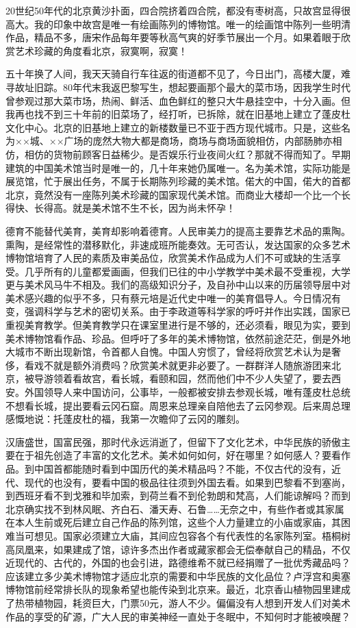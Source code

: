 \documentclass{article}
\begin{document}
20世纪50年代的北京黄沙扑面，四合院挤着四合院，都没有枣树高，只故宫显得很高大。我的印象中故宫是唯一有绘画陈列的博物馆。唯一的绘画馆中陈列一些明清作品，精品不多，唐宋作品每年要等秋高气爽的好季节展出一个月。如果着眼于欣赏艺术珍藏的角度看北京，寂寞啊，寂寞！

五十年换了人间，我天天骑自行车往返的街道都不见了，今日出门，高楼大厦，难寻故址旧踪。80年代末我返巴黎写生，想起要画那个最大的菜市场，因我学生时代曾参观过那大菜市场，热闹、鲜活、血色鲜红的整只大牛悬挂空中，十分入画。但我再也找不到三十年前的旧菜场了，经打听，已拆除，就在旧基地上建立了蓬皮杜文化中心。北京的旧基地上建立的新楼数量已不亚于西方现代城市。只是，这些名为××城、××广场的庞然大物大都是商场，商场与商场面貌相仿，内部肠肺亦相仿，相仿的货物前顾客日益稀少。是否娱乐行业夜间火红？那就不得而知了。早期建筑的中国美术馆当时是唯一的，几十年来她仍属唯一。名为美术馆，实际功能是展览馆，忙于展出任务，不属于长期陈列珍藏的美术馆。偌大的中国，偌大的首都北京，竟然没有一座陈列美术珍藏的国家现代美术馆。而商业大楼却一个比一个长得快、长得高。就是美术馆不生不长，因为尚未怀孕！

德育不能替代美育，美育却影响着德育。人民审美力的提高主要靠艺术品的熏陶。熏陶，是经常性的潜移默化，非速成班所能奏效。无可否认，发达国家的众多艺术博物馆培育了人民的素质及审美品位，欣赏美术作品成为人们不可或缺的生活享受。几乎所有的儿童都爱画画，但我们已往的中小学教学中美术最不受重视，大学更与美术风马牛不相及。我们的高级知识分子，及自孙中山以来的历届领导层中对美术感兴趣的似乎不多，只有蔡元培是近代史中唯一的美育倡导人。今日情况有变，强调科学与艺术的密切关系。由于李政道等科学家的呼吁并作出实践，国家已重视美育教学。但美育教学只在课室里进行是不够的，还必须看，眼见为实，要到美术博物馆看作品、珍品。但呼吁了多年的美术博物馆，依然前途茫茫，倒是外地大城市不断出现新馆，令首都人自愧。中国人穷惯了，曾经将欣赏艺术认为是奢侈，看戏不就是额外消费吗？欣赏美术就更非必要了。一群群洋人随旅游团来北京，被导游领着看故宫，看长城，看颐和园，然而他们中不少人失望了，要去西安。外国领导人来中国访问，公事毕，一般都被安排去参观长城，唯有蓬皮杜总统不想看长城，提出要看云冈石窟。周恩来总理亲自陪他去了云冈参观。后来周总理感慨地说：托蓬皮杜的福，我第一次瞻仰了云冈的雕刻。

汉唐盛世，国富民强，那时代永远消逝了，但留下了文化艺术，中华民族的骄傲主要在于祖先创造了丰富的文化艺术。美术如何如何，好在哪里？如何感人？要看作品。到中国首都能随时看到中国历代的美术精品吗？不能，不仅古代的没有，近代、现代的也没有，要看中国的极品往往须到外国去看。如果到巴黎看不到塞尚，到西班牙看不到戈雅和毕加索，到荷兰看不到伦勃朗和梵高，人们能谅解吗？而到北京确实找不到林风眠、齐白石、潘天寿、石鲁……无奈之中，有些作者或其家属在本人生前或死后建立自己作品的陈列馆，这些个人力量建立的小庙或家庙，其困难当可想见。国家必须建立大庙，其间应包容各个有代表性的名家陈列室。梧桐树高凤凰来，如果建成了馆，谅许多杰出作者或藏家都会无偿奉献自己的精品，不仅近现代的、古代的，外国的也会引进，路德维希不就已经捐赠了一批优秀藏品吗？应该建立多少美术博物馆才适应北京的需要和中华民族的文化品位？卢浮宫和奥塞博物馆前经常排长队的现象希望也能传染到北京来。最近，北京香山植物园里建成了热带植物园，耗资巨大，门票50元，游人不少。偏偏没有人想到开发人们对美术作品的享受的矿源，广大人民的审美神经一直处于冬眠中，不知何时才能被唤醒？
\end{document}

